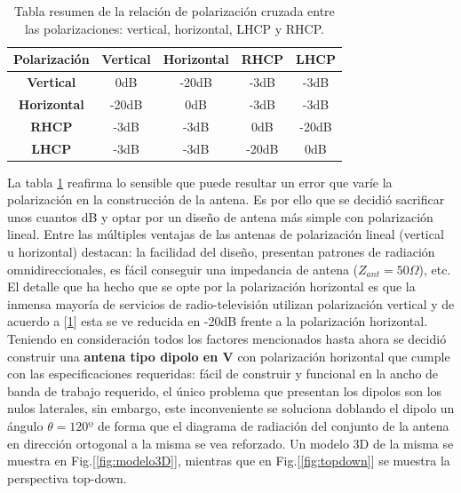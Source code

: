 \documentclass[a4paper,openright,12pt]{article}
\begin{document}
\begin{table}[h!]
\centering
\begin{tabular}{|c|c|c|c|c|} 
\hline
\textbf{Polarización} & \textbf{Vertical} & \textbf{Horizontal} & \textbf{RHCP} & \textbf{LHCP}  \\ 
\hline
\textbf{Vertical}     & 0dB               & -20dB               & -3dB          & -3dB           \\ 
\hline
\textbf{Horizontal}   & -20dB             & 0dB                 & -3dB          & -3dB           \\ 
\hline
\textbf{RHCP}         & -3dB              & -3dB                & 0dB           & -20dB          \\ 
\hline
\textbf{LHCP}         & -3dB              & -3dB                & -20dB         & 0dB            \\
\hline
\end{tabular}
\caption{Tabla resumen de la relación de polarización cruzada entre las polarizaciones: vertical, horizontal, LHCP y RHCP.}
\label{Tab2:x_pol}
\end{table}

La tabla \ref{Tab2:x_pol} reafirma lo sensible que puede resultar un error que varíe la polarización en la construcción de la antena. Es por ello que se decidió sacrificar unos cuantos dB y optar por un diseño de antena más simple con polarización lineal. Entre las múltiples ventajas de las antenas de polarización lineal (vertical u horizontal) destacan: la facilidad del diseño, presentan patrones de radiación omnidireccionales, es fácil conseguir una impedancia de antena ($Z_{ant}=50\Omega$), etc.
El detalle que ha hecho que se opte por la polarización horizontal es que la inmensa mayoría de servicios de radio-televisión utilizan polarización vertical y de acuerdo a [\ref{Tab2:x_pol}] esta se ve reducida en -20dB frente a la polarización horizontal. \\

Teniendo en consideración todos los factores mencionados hasta ahora se decidió construir una \textbf{antena tipo dipolo en V} con polarización horizontal que  cumple con las especificaciones requeridas: fácil de construir y funcional en la ancho de banda de trabajo requerido, el único problema que presentan los dipolos son los nulos laterales, sin embargo, este inconveniente se soluciona doblando el dipolo un ángulo $\theta=120º$ de forma que el diagrama de radiación del conjunto de la antena en dirección ortogonal a la misma se vea reforzado. Un modelo 3D de la misma se muestra en Fig.[\ref{fig:modelo3D}], mientras que en Fig.[\ref{fig:topdown}] se muestra la perspectiva top-down.
\end{document}

